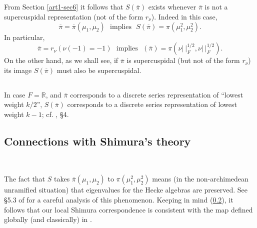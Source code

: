\subsection{}\label{art1-sec7.3}
From Section \ref{art1-sec6} it follows that $S(\overline{\pi})$ exists whenever $\overline{\pi}$ is not a supercuspidal representation (not of the form $r_{\nu}$). Indeed in this case,
$$
\overline{\pi}=\overline{\pi}(\mu_{1},\mu_{2})\text{~ implies~ } S(\overline{\pi})=\pi(\mu^{2}_{1},\mu^{2}_{2}).
$$
In particular,
$$
\overline{\pi}=r_{\nu}(\nu(-1)=-1)\text{~ implies~ } (\overline{\pi})=\pi(\nu|~|^{1/2}_{F},\nu|~|_{F}^{1/2}).
$$
On the other hand, as we shall see, if $\overline{\pi}$ is supercuspidal (but not of the form $r_{\nu}$) its image $S(\overline{\pi})$ must also be supercuspidal.

\subsection{}\label{art1-sec7.4}
In case $F=\mathbb{R}$, and $\overline{\pi}$ corresponds to a discrete series representation of ``lowest weight $k/2$'', $S(\overline{\pi})$ corresponds to a discrete series representation of lowest weight $k-1$; cf. \cite{Ge}, \S4.

\subsection{Connections with Shimura's theory}\label{art1-sec7.5}
~

The fact that $S$ takes $\overline{\pi}(\mu_{1},\mu_{2})$ to $\pi(\mu^{2}_{1},\mu^{2}_{2})$ means (in the non-archi\-medean unramified situation) that eigenvalues for the Hecke algebras are preserved. See \S5.3 of \cite{Ge} for a careful analysis of this phenomenon. Keeping in mind (\ref{art1-sec7.4}), it follows that our local Shimura correspondence is consistent with the map defined globally (and classically) in \cite{Shim}.

